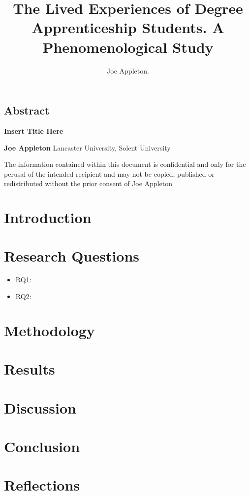 \documentclass[a4paper,man,natbib,floatsintext]{apa6}
\title{The Lived Experiences of Degree Apprenticeship Students. A Phenomenological Study}
\author{Joe Appleton.}
\affiliation{Lancaster University, Solent University}
\begin{document}
\begin{titlepage}


\clearpage


\section{Abstract}


\clearpage




 


\begin{center}
		\textbf{ \large Insert Title Here} \break
        \vspace{15cm}

        \textbf{ \large Joe Appleton} \break
         \large Lancaster University, Solent University \break
	
\end{center}

		The information contained within this document is confidential and only for the perusal of the intended recipient and may not be copied, published or redistributed without the prior consent of Joe Appleton

\clearpage


\end{titlepage}
\tableofcontents

\clearpage  

\section{Introduction}


\section{Research Questions}


\begin{itemize}
\item RQ1:  
\item RQ2: 
\end{itemize}

\section{Methodology}



\section{Results}



\section{Discussion}




\section{Conclusion}

\section{Reflections}


\appendix
\end{document}
